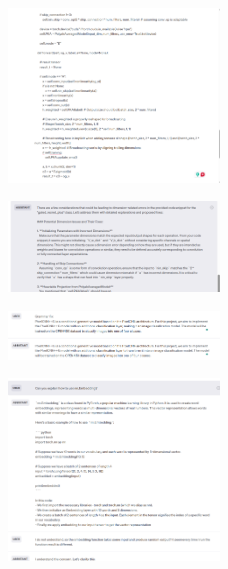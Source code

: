 \documentclass{article}
\begin{document}
\begin{figure}[H]
    \centering
    \includegraphics[width=0.5\textwidth]{report_data/g-3.png}

\end{figure}

\begin{figure}[H]
    \centering
    \includegraphics[width=0.5\textwidth]{report_data/g-4.png}
\end{figure}

\begin{figure}[H]
    \centering
    \includegraphics[width=0.5\textwidth]{report_data/g-5.png}
\end{figure}

\begin{figure}[H]
    \centering
    \includegraphics[width=0.5\textwidth]{report_data/g-6.png}
\end{figure}
\end{document}
